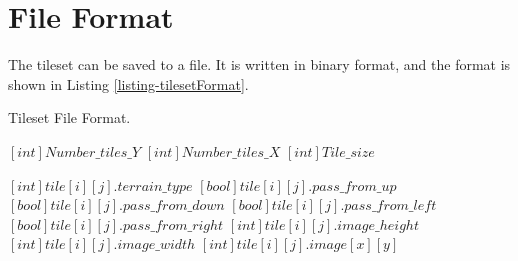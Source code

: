 	\section{File Format}
		The tileset can be saved to a file. It is written in binary format, and the format is shown in Listing \ref{listing-tilesetFormat}.
		
		\begin{algorithm}[H]
			\caption{Tileset File Format.}
	      \label{listing-tilesetFormat}
	      \begin{algorithmic}
			\STATE $[int]Number\_tiles\_Y$
			\STATE $[int]Number\_tiles\_X$
			\STATE $[int]Tile\_size$
			
					\STATE $[int]tile[i][j].terrain\_type$
					\STATE $[bool]tile[i][j].pass\_from\_up$
					\STATE $[bool]tile[i][j].pass\_from\_down$
					\STATE $[bool]tile[i][j].pass\_from\_left$
					\STATE $[bool]tile[i][j].pass\_from\_right$
					\STATE $[int]tile[i][j].image\_height$
					\STATE $[int]tile[i][j].image\_width$
							\STATE $[int]tile[i][j].image[x][y]$
						\ENDFOR
					\ENDFOR
				\ENDFOR
			\ENDFOR
		  \end{algorithmic}
		 \end{algorithm}